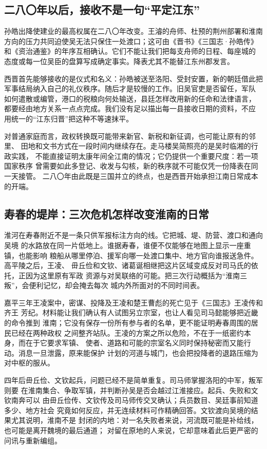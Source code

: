 \subsection{二八〇年以后，接收不是一句“平定江东”}

孙皓出降使建业的最高权属在二八〇年改变。王濬的舟师、杜预的荆州部署和淮南
方向的压力共同迫使吴无法只保住一处渡口；这可由《晋书》《三国志·孙皓传》
和《资治通鉴》的年序互相确认。它们不能让我们把每支舟师的日程、每座城的
态度或每一位吴臣的盘算写成确定事实。降表尤其不能替江东州郡发言。

西晋首先能够接收的是仪式和名义：孙皓被送至洛阳、受封安置，新的朝廷借此把
军事结局纳入自己的礼仪秩序。随后才是较慢的工作。旧吴官吏是否留任，军队
如何遣散或编管，港口的税粮向何处输送，县廷怎样改用新的任命和法律语言，
都要经由地方关系一点点完成。我们没有足以描出每一县接收日期的资料，不应
用统一的“江东归晋”把这种不等速抹平。

对普通家庭而言，政权转换既可能带来新官、新税和新征调，也可能让原有的邻里、
田地和文书方式在一段时间内继续存在。走马楼吴简照亮的是吴时临湘的行政实践，
不能直接证明太康年间全江南的情况；它仍提供一个重要尺度：若一项国家秩序
曾需要如此多登记、收发与勾核，新的秩序就不可能仅凭一份降表在同一天接管。
二八〇年由此既是三国并立的终点，也是西晋开始承担江南日常成本的开端。

\subsection{寿春的堤岸：三次危机怎样改变淮南的日常}

淮河在寿春附近不是一条只供军报标注方向的线。它把城、堤、防营、渡口和通向吴境
的水路放在同一片低地上。谁据寿春，谁便不仅能够在地图上显示一座重镇，也能影响
粮船从哪里停泊、援军向哪一处渡口集中、地方官向谁报送急件。高平陵之后，王凌、
毌丘俭和文钦、诸葛诞相继把这片区域变成反对司马氏的依托，正因为这里原有军政
资源与对吴联络的可能。把三次行动概括为“淮南三叛”，会便利记忆，却会掩去每次
城内外所面对的不同时间表。

嘉平三年王凌案中，密谋、投降及王凌和楚王曹彪的死亡见于《三国志》王凌传和齐王
芳纪。材料能让我们确认有人试图另立宗室，也让人看见司马懿能够把近畿的命令推到
淮南；它没有保存一份所有参与者的名单，更不能证明寿春周围的居民已经在两种政权
之间整齐站队。王凌的方案之所以危险，不在于一纸密约本身，而在于它要求军镇、
使者、道路和可能的宗室名义同时保持秘密而又能行动。消息一旦泄露，原来能保护
计划的河道与城门，也会把投降者的退路压缩为对中枢的服从。

四年后毌丘俭、文钦起兵，问题已经不是简单重复。司马师掌握洛阳的中军，叛军则要
在淮南集合、争取军镇，并判断孙吴是否会越过江淮接应。起兵、失败和文钦南奔可以
由毌丘俭传、文钦传及司马师传交叉确认；兵员数目、吴廷事前知道多少、地方社会
究竟如何反应，并无连续材料可作精确回答。文钦渡向吴境的结果尤其说明，淮南不是
封闭的内地：对一名失败者来说，河流既可能是补给线，也可能是离开魏境的最后通道；
对留在原地的人来说，它却意味着此后更严密的问讯与重新编组。

